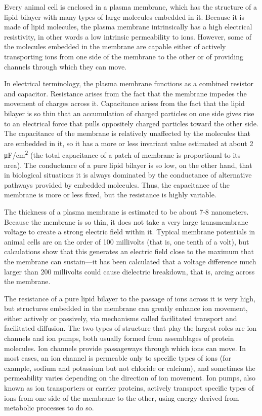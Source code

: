 Every animal cell is enclosed in a plasma membrane, which has the structure of a lipid bilayer with many types of large molecules embedded in it. Because it is made of lipid molecules, the plasma membrane intrinsically has a high electrical resistivity, in other words a low intrinsic permeability to ions. However, some of the molecules embedded in the membrane are capable either of actively transporting ions from one side of the membrane to the other or of providing channels through which they can move.

In electrical terminology, the plasma membrane functions as a combined resistor and capacitor. Resistance arises from the fact that the membrane impedes the movement of charges across it. Capacitance arises from the fact that the lipid bilayer is so thin that an accumulation of charged particles on one side gives rise to an electrical force that pulls oppositely charged particles toward the other side. The capacitance of the membrane is relatively unaffected by the molecules that are embedded in it, so it has a more or less invariant value estimated at about 2 μF/cm\textsuperscript{2} (the total capacitance of a patch of membrane is proportional to its area). The conductance of a pure lipid bilayer is so low, on the other hand, that in biological situations it is always dominated by the conductance of alternative pathways provided by embedded molecules. Thus, the capacitance of the membrane is more or less fixed, but the resistance is highly variable.

The thickness of a plasma membrane is estimated to be about 7-8 nanometers. Because the membrane is so thin, it does not take a very large transmembrane voltage to create a strong electric field within it. Typical membrane potentials in animal cells are on the order of 100 millivolts (that is, one tenth of a volt), but calculations show that this generates an electric field close to the maximum that the membrane can sustain---it has been calculated that a voltage difference much larger than 200 millivolts could cause dielectric breakdown, that is, arcing across the membrane.

The resistance of a pure lipid bilayer to the passage of ions across it is very high, but structures embedded in the membrane can greatly enhance ion movement, either actively or passively, via mechanisms called facilitated transport and facilitated diffusion. The two types of structure that play the largest roles are ion channels and ion pumps, both usually formed from assemblages of protein molecules. Ion channels provide passageways through which ions can move. In most cases, an ion channel is permeable only to specific types of ions (for example, sodium and potassium but not chloride or calcium), and sometimes the permeability varies depending on the direction of ion movement. Ion pumps, also known as ion transporters or carrier proteins, actively transport specific types of ions from one side of the membrane to the other, using energy derived from metabolic processes to do so.

